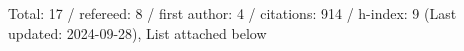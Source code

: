 Total: 17 / refereed: 8 / first author: 4 / citations: 914 / h-index: 9 (Last updated: 2024-09-28), List attached below